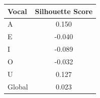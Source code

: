 \begin{tabular}{lc}
\toprule
\rowcolor{col01}
Vocal & Silhouette Score \\
\midrule
A & 0.150 \\
E & -0.040 \\
I & -0.089 \\
O & -0.032 \\
U & 0.127 \\
Global & 0.023 \\
\bottomrule
\end{tabular}
